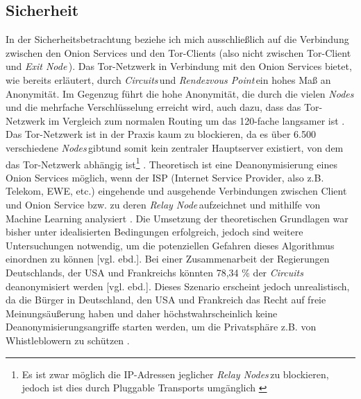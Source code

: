 \documentclass[a4paper,ngerman, headheight=28pt,12pt]{scrartcl}
\newcommand{\vcite}[1]{\cite[vgl.][]{#1}}
\newcommand{\vebd}{[vgl. ebd.]}
\newcommand{\relayn}{\textit{Relay Node\,}}
\newcommand{\relayns}{\textit{Relay Nodes\,}}
\newcommand{\exitn}{\textit{Exit Node\,}}
\newcommand{\nodes}{\textit{Nodes\,}}
\newcommand{\circuits}{\textit{Circuits\,}}
\newcommand{\renp}{\textit{Rendezvous Point\,}}
\begin{document}
\subsection{Sicherheit}
In der Sicherheitsbetrachtung beziehe ich mich ausschließlich auf die Verbindung zwischen den Onion Services und den Tor-Clients (also nicht zwischen Tor-Client und \exitn). Das Tor-Netzwerk in Verbindung mit den Onion Services bietet, wie bereits erläutert, durch \circuits und \renp ein hohes Maß an Anonymität. Im Gegenzug führt die hohe Anonymität, die durch die vielen \nodes und die mehrfache Verschlüsselung erreicht wird, auch dazu, dass das Tor-Netzwerk im Vergleich zum normalen Routing um das 120-fache langsamer ist \vcite{TorPerformance}. Das Tor-Netzwerk ist in der Praxis kaum zu blockieren, da es über 6.500 verschiedene \nodes gibtund somit kein zentraler Hauptserver existiert, von dem das Tor-Netzwerk abhängig ist\footnote{Es ist zwar möglich die IP-Adressen jeglicher \relayns zu blockieren, jedoch ist dies durch Pluggable Transports umgänglich \vcite{PluggableTransports}} \vcite{DeanonymizingTorBook}.
Theoretisch ist eine Deanonymisierung eines Onion Services möglich, wenn der ISP (Internet Service Provider, also z.B. Telekom, EWE, etc.) eingehende und ausgehende Verbindungen zwischen Client und Onion Service bzw. zu deren \relayn aufzeichnet und mithilfe von Machine Learning analysiert \vcite{OnionServiceFingerprinting}. Die Umsetzung der theoretischen Grundlagen war bisher unter idealisierten Bedingungen erfolgreich, jedoch sind weitere Untersuchungen notwendig, um die potenziellen Gefahren dieses Algorithmus einordnen zu können \vebd. Bei einer Zusammenarbeit der Regierungen Deutschlands, der USA und Frankreichs könnten 78,34 \% der \circuits deanonymisiert werden \vebd.
Dieses Szenario erscheint jedoch unrealistisch, da die Bürger in Deutschland, den USA und Frankreich das Recht auf freie Meinungsäußerung haben und daher höchstwahrscheinlich keine Deanonymisierungsangriffe starten werden, um die Privatsphäre z.B. von Whistleblowern zu schützen \vcite{AmnReport,ROG-USA}.
\end{document}
